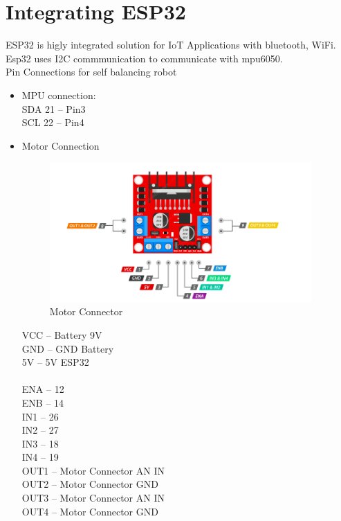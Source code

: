\documentclass{article}
\begin{document}
  
  \section{Integrating ESP32}
  ESP32 is higly integrated solution for IoT Applications with bluetooth, WiFi. Esp32 uses I2C commmunication to communicate with mpu6050.
  \\  
  Pin Connections for self balancing robot 
  \begin{itemize}
  	\item MPU connection:
  		\\
		SDA 21 -- Pin3
		\\	
		SCL 22 -- Pin4
		\\ 	  
		\item Motor Connection
		\\
			\begin{figure}[h]
 			\centering
 			\includegraphics[width=100mm,scale=0.5]{PinConnection}
 			\caption{Motor Connector}
 			\label{Pin Specification for L298N H-Bridge }
 		\end{figure}
 	
 		VCC	-- Battery 9V\\
 		GND	-- GND Battery\\
 		5V	-- 5V ESP32\\
 		\\
 		ENA -- 12\\
 		ENB -- 14\\
 		IN1	-- 26\\
 		IN2	-- 27\\
 		IN3	-- 18\\
 		IN4	-- 19\\
		
 		OUT1 -- Motor Connector AN IN\\
 		OUT2 -- Motor Connector GND\\
 		OUT3 -- Motor Connector AN IN\\
 		OUT4 -- Motor Connector GND
	\end{itemize}
  
\end{document}
